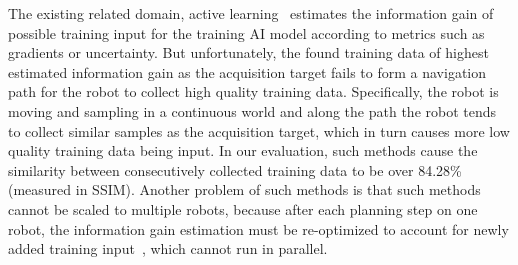 The existing related domain, active learning~\cite{avidan_activenerf_2022,ash2020deep,nguyen2022measure} estimates the information gain of possible training input for the training AI model according to metrics such as gradients or uncertainty.
But unfortunately, the found training data of highest estimated information gain as the acquisition target fails to form a navigation path for the robot to collect high quality training data.
Specifically, the robot is moving and sampling in a continuous world and along the path the robot tends to collect similar samples as the acquisition target, which in turn causes more low quality training data being input.
In our evaluation, such methods cause the similarity between consecutively collected training data to be over 84.28\% (measured in SSIM).
Another problem of such methods is that such methods cannot be scaled to multiple robots, because after each planning step on one robot, the information gain estimation must be re-optimized to account for newly added training input~\cite{avidan_activenerf_2022,jin_neu-nbv_2023,ash_deep_2020}, which cannot run in parallel.


